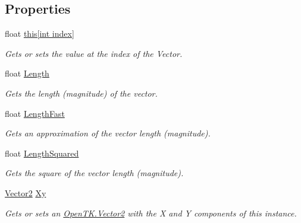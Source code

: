 \subsection*{Properties}
\begin{DoxyCompactItemize}
\item 
float \hyperlink{struct_open_t_k_1_1_vector4_a3d4906d6868ab36424bb334288838adb}{this\mbox{[}int index\mbox{]}}
\begin{DoxyCompactList}\small\item\em Gets or sets the value at the index of the Vector. \end{DoxyCompactList}\item 
float \hyperlink{struct_open_t_k_1_1_vector4_a5ebc615641557a752cfe160608f09832}{Length}
\begin{DoxyCompactList}\small\item\em Gets the length (magnitude) of the vector. \end{DoxyCompactList}\item 
float \hyperlink{struct_open_t_k_1_1_vector4_a3bebfd9daf625e3da63f9a734544e0c9}{Length\-Fast}
\begin{DoxyCompactList}\small\item\em Gets an approximation of the vector length (magnitude). \end{DoxyCompactList}\item 
float \hyperlink{struct_open_t_k_1_1_vector4_ab66b8b2f18337d5d5a758f3c76a1fd60}{Length\-Squared}
\begin{DoxyCompactList}\small\item\em Gets the square of the vector length (magnitude). \end{DoxyCompactList}\item 
\hyperlink{struct_open_t_k_1_1_vector2}{Vector2} \hyperlink{struct_open_t_k_1_1_vector4_ac64c71e973677fa725cc58e6b32c149d}{Xy}
\begin{DoxyCompactList}\small\item\em Gets or sets an \hyperlink{struct_open_t_k_1_1_vector2}{Open\-T\-K.\-Vector2} with the X and Y components of this instance. \end{DoxyCompactList}\item 

\end{DoxyCompactItemize}
